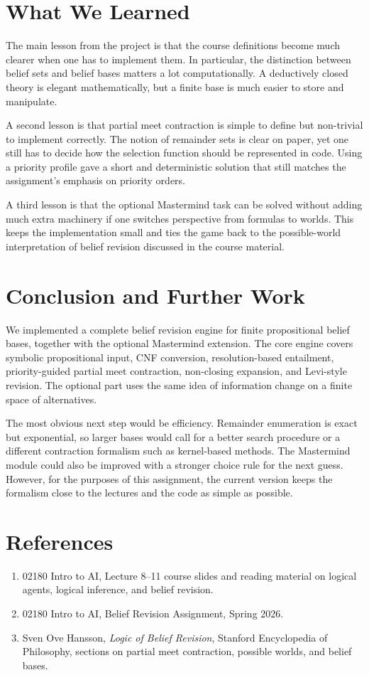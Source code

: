 \documentclass[11pt,a4paper]{article}
\begin{document}
\section{What We Learned}
The main lesson from the project is that the course definitions become much clearer when one has to implement them. In particular, the distinction between belief sets and belief bases matters a lot computationally. A deductively closed theory is elegant mathematically, but a finite base is much easier to store and manipulate.

A second lesson is that partial meet contraction is simple to define but non-trivial to implement correctly. The notion of remainder sets is clear on paper, yet one still has to decide how the selection function should be represented in code. Using a priority profile gave a short and deterministic solution that still matches the assignment's emphasis on priority orders.

A third lesson is that the optional Mastermind task can be solved without adding much extra machinery if one switches perspective from formulas to worlds. This keeps the implementation small and ties the game back to the possible-world interpretation of belief revision discussed in the course material.

\section{Conclusion and Further Work}
We implemented a complete belief revision engine for finite propositional belief bases, together with the optional Mastermind extension. The core engine covers symbolic propositional input, CNF conversion, resolution-based entailment, priority-guided partial meet contraction, non-closing expansion, and Levi-style revision. The optional part uses the same idea of information change on a finite space of alternatives.

The most obvious next step would be efficiency. Remainder enumeration is exact but exponential, so larger bases would call for a better search procedure or a different contraction formalism such as kernel-based methods. The Mastermind module could also be improved with a stronger choice rule for the next guess. However, for the purposes of this assignment, the current version keeps the formalism close to the lectures and the code as simple as possible.

\section*{References}
\begin{enumerate}[leftmargin=18pt,itemsep=2pt]
    \item 02180 Intro to AI, Lecture 8--11 course slides and reading material on logical agents, logical inference, and belief revision.
    \item 02180 Intro to AI, Belief Revision Assignment, Spring 2026.
    \item Sven Ove Hansson, \emph{Logic of Belief Revision}, Stanford Encyclopedia of Philosophy, sections on partial meet contraction, possible worlds, and belief bases.
\end{enumerate}
\end{document}
